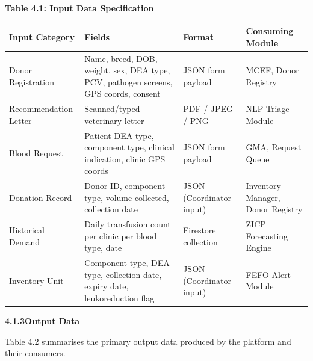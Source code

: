 \documentclass[12pt,a4paper]{article}
\begin{document}
\begin{center}
\textbf{Table 4.1: Input Data Specification}
\vspace{0.4em}
\begin{tabular}{p{3.2cm} p{4.5cm} p{2.2cm} p{3.5cm}}
\toprule
\textbf{Input Category} & \textbf{Fields} & \textbf{Format} & \textbf{Consuming Module} \\
\midrule
Donor Registration & Name, breed, DOB, weight, sex, DEA type, PCV, pathogen screens, GPS coords, consent & JSON form payload & MCEF, Donor Registry \\
\addlinespace
Recommendation Letter & Scanned/typed veterinary letter & PDF / JPEG / PNG & NLP Triage Module \\
\addlinespace
Blood Request & Patient DEA type, component type, clinical indication, clinic GPS coords & JSON form payload & GMA, Request Queue \\
\addlinespace
Donation Record & Donor ID, component type, volume collected, collection date & JSON (Coordinator input) & Inventory Manager, Donor Registry \\
\addlinespace
Historical Demand & Daily transfusion count per clinic per blood type, date & Firestore collection & ZICP Forecasting Engine \\
\addlinespace
Inventory Unit & Component type, DEA type, collection date, expiry date, leukoreduction flag & JSON (Coordinator input) & FEFO Alert Module \\
\bottomrule
\end{tabular}
\end{center}

\vspace{1.5em}
\noindent\textbf{4.1.3\quad Output Data}
\vspace{0.6em}

\noindent Table 4.2 summarises the primary output data produced by the platform and their consumers.
\end{document}
